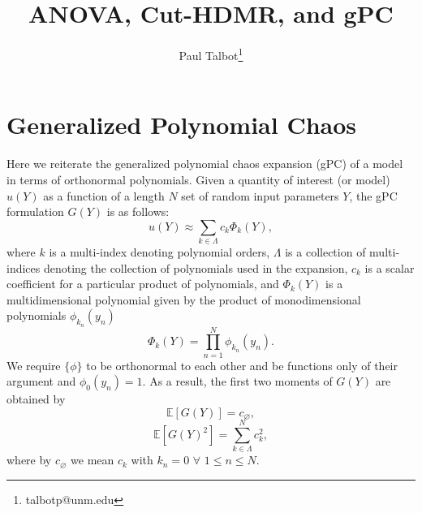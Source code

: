 \documentclass[11pt]{article}
\newcommand{\expv}[1]{\ensuremath{\mathbb{E}[ #1]}}
\begin{document}
\title{ANOVA, Cut-HDMR, and gPC}

\author[]{Paul Talbot\thanks{talbotp@unm.edu}}
\renewcommand\Authands{ and }
\maketitle

\section{Generalized Polynomial Chaos}
Here we reiterate the generalized polynomial chaos expansion (gPC) of a model in terms of orthonormal
polynomials.  Given a quantity of interest (or model) $u(Y)$ as a function of a length $N$ set of random 
input parameters $Y$, the gPC formulation $G(Y)$ is as follows:
\begin{equation}
  u(Y)\approx \sum_{k\in\Lambda} c_k \Phi_k(Y),
\end{equation}
where $k$ is a multi-index denoting polynomial orders, $\Lambda$ is a collection of multi-indices denoting the
collection of polynomials used in the expansion, $c_k$ is a scalar coefficient for a particular product of
polynomials, and $\Phi_k(Y)$ is a multidimensional polynomial given by the product of monodimensional
polynomials $\phi_{k_n}(y_n)$
\begin{equation}
  \Phi_k(Y) = \prod_{n=1}^N \phi_{k_n}(y_n).
\end{equation}
We require $\{\phi\}$ to be orthonormal to each other and be functions only of their argument and $\phi_0(y_n) = 1$.  As a result,
the first two moments of $G(Y)$ are obtained by
\begin{equation}
  \expv{G(Y)} = c_{\varnothing},
\end{equation}
\begin{equation}
  \expv{G(Y)^2} = \sum_{k\in\Lambda}^N c_k^2,
\end{equation}
where by $c_\varnothing$ we mean $c_k$ with $k_n=0$ $\forall$ $1\leq n\leq N$.
\end{document}
